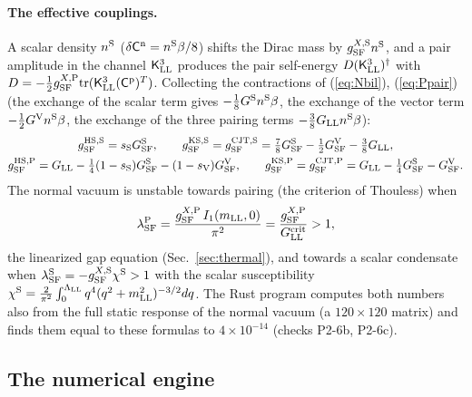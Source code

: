 \documentclass[aps,prd,onecolumn,superscriptaddress,nofootinbib,floatfix,longbibliography]{revtex4-2}
\newcommand{\LL}{{\rm LL}}
\newcommand{\SF}{{\rm SF}}
\newcommand{\tr}{\mathrm{tr}}
\begin{document}
\paragraph*{The effective couplings.}
A scalar density $n^{\rm S}$ ($\delta\mathsf C^{\rm n}=n^{\rm S}\beta/8$) shifts the Dirac mass by $g^{X,{\rm S}}_\SF n^{\rm S}$, and a pair amplitude in the
channel $\mathsf K^3_\LL$ produces the pair self-energy $D(\mathsf K^3_\LL)^\dagger$ with $D=-\frac12g^{X,{\rm P}}_\SF\tr(\mathsf K^3_\LL(\mathsf C^{\rm p})^T)$.
Collecting the contractions of (\ref{eq:Nbil}), (\ref{eq:Ppair}) (the exchange of the scalar term gives $-\frac18G^{\rm S}n^{\rm S}\beta$, the
exchange of the vector term $-\frac12G^{\rm V}n^{\rm S}\beta$, the exchange of the three pairing terms $-\frac38G_\LL n^{\rm S}\beta$):
\begin{gather}
g^{{\rm HS},{\rm S}}_\SF=s_{\rm S}G^{\rm S}_\SF,\qquad g^{{\rm KS},{\rm S}}_\SF=g^{{\rm CJT},{\rm S}}_\SF=\tfrac78G^{\rm S}_\SF-\tfrac12G^{\rm V}_\SF-\tfrac38G_\LL,\label{eq:gS}\\
g^{{\rm HS},{\rm P}}_\SF=G_\LL-\tfrac14(1-s_{\rm S})G^{\rm S}_\SF-(1-s_{\rm V})G^{\rm V}_\SF,\qquad g^{{\rm KS},{\rm P}}_\SF=g^{{\rm CJT},{\rm P}}_\SF=G_\LL-\tfrac14G^{\rm S}_\SF-G^{\rm V}_\SF.\label{eq:gP}
\end{gather}
The normal vacuum is unstable towards pairing (the criterion of Thouless) when
\begin{equation}
\lambda^{\rm P}_\SF=\frac{g^{X,{\rm P}}_\SF\,I_1(m_\LL,0)}{\pi^2}=\frac{g^{X,{\rm P}}_\SF}{G^{\rm crit}_\LL}>1,
\label{eq:lambda0}
\end{equation}
the linearized gap equation (Sec.~\ref{sec:thermal}), and towards a scalar condensate when $\lambda^{\rm S}_\SF=-g^{X,{\rm S}}_\SF\chi^{\rm S}>1$ with
the scalar susceptibility $\chi^{\rm S}=\frac2{\pi^2}\int_0^{\Lambda_\LL}q^4(q^2+m_\LL^2)^{-3/2}dq$. The Rust program computes both numbers also from
the full static response of the normal vacuum (a $120\times120$ matrix) and finds them equal to these formulas to $4\times10^{-14}$
(checks P2-6b, P2-6c).

\subsection{The numerical engine}
\end{document}
